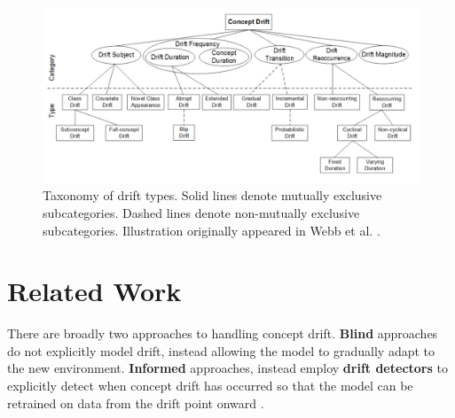\begin{figure}
    \centering
    \includegraphics[width=\textwidth]{images/drift_taxonomy.png}
    \caption{Taxonomy of drift types. Solid lines denote mutually exclusive subcategories. Dashed lines denote non-mutually exclusive subcategories. Illustration originally appeared in Webb et al. \cite{characterizing_drift}.}
    \label{fig:drift_taxonomy}
\end{figure}



\section{Related Work} \label{background:related_work}

There are broadly two approaches to handling concept drift. {\bf Blind} approaches do not explicitly model drift, instead allowing the model to gradually adapt to the new environment. {\bf Informed} approaches, instead employ {\bf drift detectors} to explicitly detect when concept drift has occurred so that the model can be retrained on data from the drift point onward \cite{gama_survey}.

